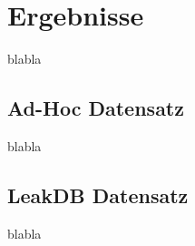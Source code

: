 \chapter{Ergebnisse}

blabla

\section{Ad-Hoc Datensatz}

blabla

\section{LeakDB Datensatz}

blabla

